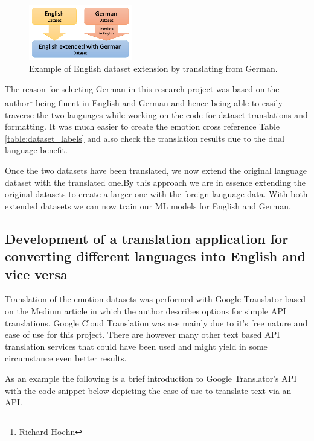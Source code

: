 \documentclass[11pt]{article}
\begin{document}
\begin{figure}[h]
    \centering
    \includegraphics[width=0.4\textwidth]{Dataset-Extension}
    \caption{Example of English dataset extension by translating from German.}
    \label{fig:dataset-extension}
\end{figure}

The reason for selecting German in this research project was based on the author\footnote{Richard Hoehn} being fluent in English and German and hence being able to easily traverse the two languages while working on the code for dataset translations and formatting. It was much easier to create the emotion cross reference Table \ref{table:dataset_labels} and also check the translation results due to the dual language benefit.

Once the two datasets have been translated, we now extend the original language dataset with the translated one.By this approach we are in essence extending the original datasets to create a larger one with the foreign language data. With both extended datasets we can now train our ML models for English and German.

\subsection{Development of a translation application for converting different languages into English and vice versa}
Translation of the emotion datasets was performed with Google Translator based on the Medium article\cite{Nidhaloff_how_to_translate_text_with_python} in which the author describes options for simple API translations. Google Cloud Translation was use mainly due to it's free nature and ease of use for this project. There are however many other text based API translation services that could have been used and might yield in some circumstance even better results.

As an example the following is a brief introduction to Google Translator's API with the code snippet below depicting the ease of use to translate text via an API.
\end{document}
